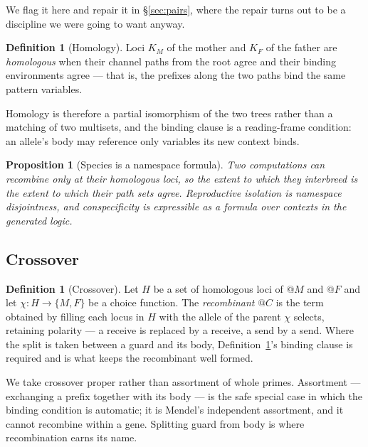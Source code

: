 \documentclass[11pt]{article}
\theoremstyle{plain}
\newtheorem{proposition}[theorem]{Proposition}
\theoremstyle{definition}
\newtheorem{definition}[theorem]{Definition}
\begin{document}
We flag it here and repair it in \S\ref{sec:pairs}, where the repair turns out to be a discipline
we were going to want anyway.

\begin{definition}[Homology]
\label{def:homology}
Loci $K_M$ of the mother and $K_F$ of the father are \emph{homologous} when their channel paths from
the root agree and their binding environments agree --- that is, the prefixes along the two paths bind
the same pattern variables.
\end{definition}

Homology is therefore a partial isomorphism of the two trees rather than a matching of two multisets,
and the binding clause is a reading-frame condition: an allele's body may reference only variables its
new context binds.

\begin{proposition}[Species is a namespace formula]
\label{prop:species}
Two computations can recombine only at their homologous loci, so the extent to which they interbreed
is the extent to which their path sets agree. Reproductive isolation is namespace disjointness, and
conspecificity is expressible as a formula over contexts in the generated logic.
\end{proposition}

\subsection{Crossover}

\begin{definition}[Crossover]
\label{def:crossover}
Let $H$ be a set of homologous loci of $@M$ and $@F$ and let $\chi : H \to \{M, F\}$ be a choice
function. The \emph{recombinant} $@C$ is the term obtained by filling each locus in $H$ with the
allele of the parent $\chi$ selects, retaining polarity --- a receive is replaced by a receive, a send
by a send. Where the split is taken between a guard and its body, Definition~\ref{def:homology}'s
binding clause is required and is what keeps the recombinant well formed.
\end{definition}

We take crossover proper rather than assortment of whole primes. Assortment --- exchanging a prefix
together with its body --- is the safe special case in which the binding condition is automatic; it is
Mendel's independent assortment, and it cannot recombine within a gene. Splitting guard from body is
where recombination earns its name.
\end{document}
